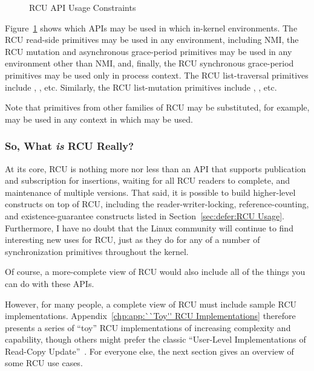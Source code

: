 \begin{figure}[tb]
\centering
{}
\caption{RCU API Usage Constraints}
\label{fig:defer:RCU API Usage Constraints}
\end{figure}

Figure~\ref{fig:defer:RCU API Usage Constraints}
shows which APIs may be used in which in-kernel environments.
The RCU read-side primitives may be used in any environment, including NMI,
the RCU mutation and asynchronous grace-period primitives may be used in any
environment other than NMI, and, finally, the RCU synchronous grace-period
primitives may be used only in process context.
The RCU list-traversal primitives include ,
, etc.
Similarly, the RCU list-mutation primitives include
, , etc.

Note that primitives from other families of RCU may be substituted,
for example,  may be used in any context
in which  may be used.

\subsubsection{So, What \emph{is} RCU Really?}
\label{sec:defer:So, What is RCU Really?}

At its core, RCU is nothing more nor less than an API that supports
publication and subscription for insertions, waiting for all RCU readers
to complete, and maintenance of multiple versions.
That said, it is possible to build higher-level constructs
on top of RCU, including the reader-writer-locking, reference-counting,
and existence-guarantee constructs listed in
Section~\ref{sec:defer:RCU Usage}.
Furthermore, I have no doubt that the Linux community will continue to
find interesting new uses for RCU,
just as they do for any of a number of synchronization
primitives throughout the kernel.

Of course, a more-complete view of RCU would also include
all of the things you can do with these APIs.

However, for many people, a complete view of RCU must include sample
RCU implementations.
Appendix~\ref{chp:app:``Toy'' RCU Implementations} therefore presents a series
of ``toy'' RCU implementations of increasing complexity and capability,
though others might prefer the classic
``User-Level Implementations of Read-Copy
Update''~\cite{MathieuDesnoyers2012URCU}.
For everyone else, the next section gives an overview of some RCU use cases.
